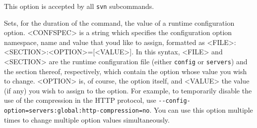 \begin{description}
This option is accepted by all \texttt{svn} subcommands.
\item[\protect\phantomsection\label{svn.ref.svn.sw.config_option}{}\texttt{-\/-config-option}
\textless CONFSPEC\textgreater{}]
Sets, for the duration of the command, the value of a runtime
configuration option. \textless CONFSPEC\textgreater{} is a string which
specifies the configuration option namespace, name and value that
you\textquotesingle d like to assign, formatted as
\textless FILE\textgreater:\textless SECTION\textgreater:\textless OPTION\textgreater={[}\textless VALUE\textgreater{]}.
In this syntax, \textless FILE\textgreater{} and
\textless SECTION\textgreater{} are the runtime configuration file
(either \texttt{config} or \texttt{servers}) and the section thereof,
respectively, which contain the option whose value you wish to change.
\textless OPTION\textgreater{} is, of course, the option itself, and
\textless VALUE\textgreater{} the value (if any) you wish to assign to
the option. For example, to temporarily disable the use of the
compression in the HTTP protocol, use
\texttt{-\/-config-option=servers:global:http-compression=no}. You can
use this option multiple times to change multiple option values
simultaneously.


\end{description}
